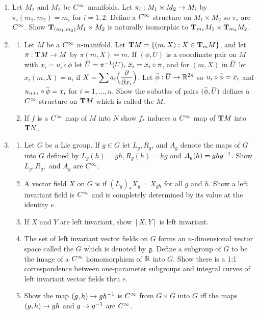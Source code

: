 \documentclass[../main]{subfiles}
\begin{document}
\begin{enumerate}
\item\label{pro:18} Let $M_1$ and $M_2$ be $\CInfty$ manifolds. Let $\pi_i : M_1 \times M_2 \functionMaps M_i$ by $\pi_i (m_1, m_2) = m_i$ for $i=1,2$. Define a $\CInfty$ structure on $M_1 \times M_2$ so $\pi_i$ are $\CInfty$. Show $\tangentspace{M_1 \times M_2}{(m_1, m_2)}$ is naturally isomorphic to $\tangentspace{M_1}{m_1} \times \tangentspace{M_2}{m_2}$.


\item\label{pro:19}
\begin{enumerate}[label=(\roman{enumii})]
    \item Let $M$ be a $\CInfty$ $n$-manifold. Let $\tangentbundle{M} = \{(m,X): X \in \tangentspace{M}{m}\}$, and let $\pi: \tangentbundle{M} \functionMaps M$ by $\pi(m,X) = m$. If $(\phi, U)$ is a coordinate pair on $M$ with $x_i = u_i \circ \phi$ let $\xoverline{U} = \pi \inv (U),$ $\xoverline{x}_i = x_i \circ \pi$, and for $(m,X)$ in $\xoverline{U}$ let $x_i (m,X) = a_i$ if $X = \displaystyle\sum a_i \Big(\pdv{}{x_i}\Big)$. Let $\xoverline{\phi}: \xoverline{U} \functionMaps \bR^{2n}$ so $u_i \circ \xoverline{\phi} = \xoverline{x}_i$ and $u_{n+i} \circ \xoverline{\phi} = x_i$ for $i=1, \dots,n$. Show the subatlas of pairs $(\xoverline{\phi}, \xoverline{U})$ defines a $\CInfty$ structure on $\tangentbundle{M}$ which is called the  $M$.
    \item If $f$ is a $\CInfty$ map of $M$ into $N$ show $f_*$ induces a $\CInfty$ map of $\tangentbundle{M}$ into $\tangentbundle{N}$.
\end{enumerate}


\item\label{pro:20}
\begin{enumerate}[label=(\roman{enumii})]
    \item Let $G$ be a Lie group. If $g \in G$ let $L_g, R_g$, and $A_g$ denote the maps of $G$ into $G$ defined by $L_g (h) = gh, R_g (h) = hg$ and $A_g (h) = ghg\inv$. Show $L_g, R_g,$ and $A_g$ are $\CInfty$. 
    \item A vector field $X$ on $G$ is  if $(L_g)_* X_g = X_{gh}$ for all $g$ and $h$. Show a left invariant field is $\CInfty$ and is completely determined by its value at the identity $e$. 
    \item If $X$ and $Y$ are left invariant, show $[X,Y]$ is left invariant.
    \item The set of left invariant vector fields on $G$ forms an $n$-dimensional vector space called the  $G$ which is denoted by $\mathfrak{g}$. Define a  subgroup of $G$ to be the image of a $\CInfty$ homomorphism of $\bR$ into $G$. Show there is a 1:1 correspondence between one-parameter subgroups and integral curves of left invariant vector fields thru $e$.
    \item Show the map $(g,h) \functionMaps gh\inv$ is $\CInfty$ from $G\times G$ into $G$ iff the maps $(g,h) \functionMaps gh$ and $g \functionMaps g\inv$ are $\CInfty$.
\end{enumerate}



\end{enumerate}
\end{document}
